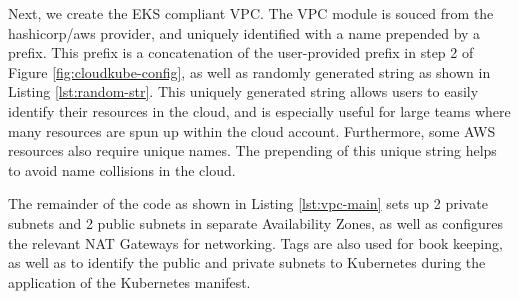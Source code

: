 Next, we create the EKS compliant VPC. The VPC module is souced from the hashicorp/aws provider, and uniquely identified with a 
name prepended by a prefix. This prefix is a concatenation of the user-provided prefix in step 2 of Figure \ref{fig:cloudkube-config},
as well as randomly generated string as shown in Listing \ref{lst:random-str}. This uniquely generated string allows users to easily identify
their resources in the cloud, and is especially useful for large teams where many resources are spun up within the cloud account. Furthermore,
some AWS resources also require unique names. The prepending of this unique string helps to avoid name collisions in the cloud.

The remainder of the code as shown in Listing \ref{lst:vpc-main} sets up 2 private subnets and 2 public subnets in separate Availability
Zones, as well as configures the relevant NAT Gateways for networking. Tags are also used for book keeping, as well as to identify
the public and private subnets to Kubernetes during the application of the Kubernetes manifest. 

